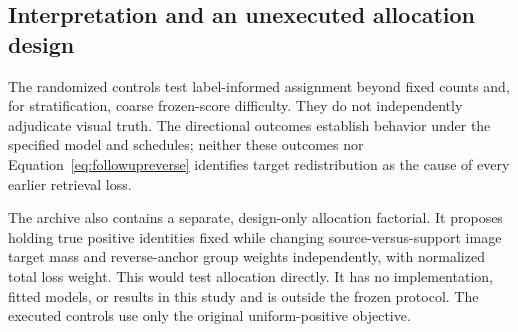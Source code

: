 \subsection{Interpretation and an unexecuted allocation design}
\label{app:followupnotrun}
The randomized controls test label-informed assignment beyond fixed counts and, for stratification, coarse frozen-score difficulty. They do not independently adjudicate visual truth. The directional outcomes establish behavior under the specified model and schedules; neither these outcomes nor Equation~\ref{eq:followupreverse} identifies target redistribution as the cause of every earlier retrieval loss.

The archive also contains a separate, design-only allocation factorial. It proposes holding true positive identities fixed while changing source-versus-support image target mass and reverse-anchor group weights independently, with normalized total loss weight. This would test allocation directly. It has no implementation, fitted models, or results in this study and is outside the frozen protocol. The executed controls use only the original uniform-positive objective.
